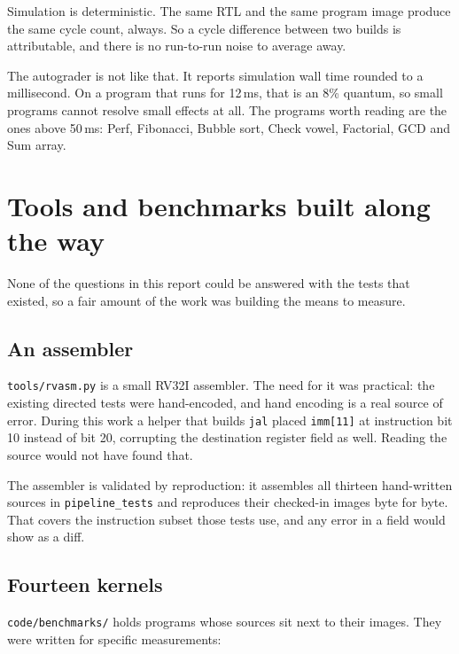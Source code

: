 \documentclass[11pt]{article}
\begin{document}
Simulation is deterministic. The same RTL and the same program image produce the same cycle
count, always. So a cycle difference between two builds is attributable, and there is no
run-to-run noise to average away.

The autograder is not like that. It reports simulation wall time rounded to a millisecond. On
a program that runs for 12\,ms, that is an 8\% quantum, so small programs cannot resolve small
effects at all. The programs worth reading are the ones above 50\,ms: Perf, Fibonacci, Bubble
sort, Check vowel, Factorial, GCD and Sum array.

\section{Tools and benchmarks built along the way}

None of the questions in this report could be answered with the tests that existed, so a fair
amount of the work was building the means to measure.

\subsection{An assembler}

\texttt{tools/rvasm.py} is a small RV32I assembler. The need for it was practical: the existing
directed tests were hand-encoded, and hand encoding is a real source of error. During this work
a helper that builds \texttt{jal} placed \texttt{imm[11]} at instruction bit 10 instead of bit
20, corrupting the destination register field as well. Reading the source would not have found
that.

The assembler is validated by reproduction: it assembles all thirteen hand-written sources in
\texttt{pipeline\_tests} and reproduces their checked-in images byte for byte. That
covers the instruction subset those tests use, and any error in a field would show as a diff.

\subsection{Fourteen kernels}

\texttt{code/benchmarks/} holds programs whose sources sit next to their images. They were
written for specific measurements:
\end{document}
